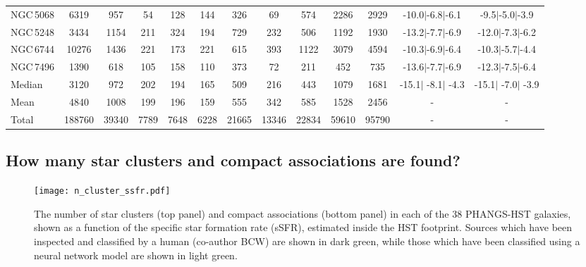 \documentclass[linenumbers]{aastex63}
\begin{document}
\begin{table*}
\begin{center}
\begin{tabular}{lcccccccccccc}
NGC\,5068 & 6319 & 957 & 54 & 128 & 144 & 326 & 69 & 574 & 2286 & 2929 & -10.0$\vert$-6.8$\vert$-6.1 & -9.5$\vert$-5.0$\vert$-3.9 \\ 
NGC\,5248 & 3434 & 1154 & 211 & 324 & 194 & 729 & 232 & 506 & 1192 & 1930 & -13.2$\vert$-7.7$\vert$-6.9 & -12.0$\vert$-7.3$\vert$-6.2 \\ 
NGC\,6744 & 10276 & 1436 & 221 & 173 & 221 & 615 & 393 & 1122 & 3079 & 4594 & -10.3$\vert$-6.9$\vert$-6.4 & -10.3$\vert$-5.7$\vert$-4.4 \\ 
NGC\,7496 & 1390 & 618 & 105 & 158 & 110 & 373 & 72 & 211 & 452 & 735 & -13.6$\vert$-7.7$\vert$-6.9 & -12.3$\vert$-7.5$\vert$-6.4 \\ 
\hline
Median & 3120 & 972 & 202 & 194 & 165 & 509 & 216 & 443 & 1079 & 1681 & -15.1$\vert$ -8.1$\vert$ -4.3 & -15.1$\vert$ -7.0$\vert$ -3.9 \\ 
Mean & 4840 & 1008 & 199 & 196 & 159 & 555 & 342 & 585 & 1528 & 2456 & - & - \\ 
Total & 188760 & 39340 & 7789 & 7648 & 6228 & 21665 & 13346 & 22834 & 59610 & 95790 & - & - \\ 
\hline
\hline
\end{tabular} 
\end{center}
\end{table*}

\subsection{How many star clusters and compact associations are found?}\label{ssect:how_many_clusters}
\begin{figure}
\texttt{[image: n\_cluster\_ssfr.pdf]}
 \caption{The number of star clusters (top panel) and compact associations (bottom panel) in each of the 38 PHANGS-HST galaxies, shown as a function of the specific star formation rate (sSFR), estimated inside the HST footprint. Sources which have been inspected and classified by a human (co-author BCW) are shown in dark green, while those which have been classified using a neural network model \citep{hannon_star_2023} are shown in light green.}
 \label{fig:n_cluster_ssfr}
\end{figure}
\end{document}
